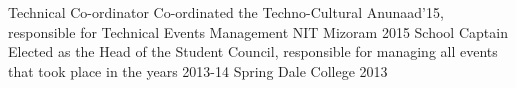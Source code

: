 \begin{cvhonors}
  \cvhonor
    {Technical Co-ordinator}
    {Co-ordinated the Techno-Cultural Anunaad'15, responsible for Technical Events Management}
    {NIT Mizoram}
    {2015}
  \cvhonor
    {School Captain}
    {Elected as the Head of the Student Council, responsible for managing all events
 	that took place in the years 2013-14}
    {Spring Dale College}
    {2013}
\end{cvhonors}
